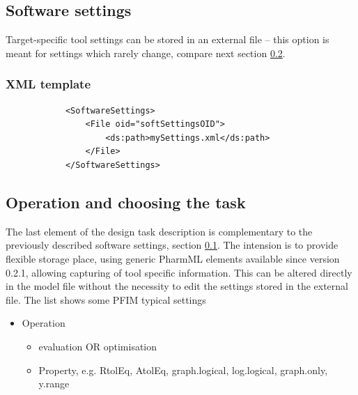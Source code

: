 \subsection{Software settings}
\label{subsec:softSettings}
Target-specific tool settings can be stored in an external file -- 
this option is meant for settings which rarely change, compare next section 
\ref{subsec:taskChoice}.

\subsubsection{XML template}
\lstset{language=XML}
\begin{lstlisting}
            <SoftwareSettings>
                <File oid="softSettingsOID">
                    <ds:path>mySettings.xml</ds:path>
                </File>
            </SoftwareSettings>
\end{lstlisting}


\subsection{Operation and choosing the task}
\label{subsec:taskChoice}

The last element of the design task description is complementary to the 
previously described software settings, section \ref{subsec:softSettings}.
The intension is to provide flexible storage place, using generic PharmML
elements available since version 0.2.1, allowing capturing of tool specific 
information. This can be altered directly in the model file without the necessity
to edit the settings stored in the external file.
The list shows some PFIM typical settings

\begin{itemize}
\item 
Operation
\begin{itemize}
\item
evaluation OR optimisation
\item 
Property, e.g. RtolEq, AtolEq, graph.logical, log.logical, graph.only, y.range
\end{itemize}
\end{itemize}

